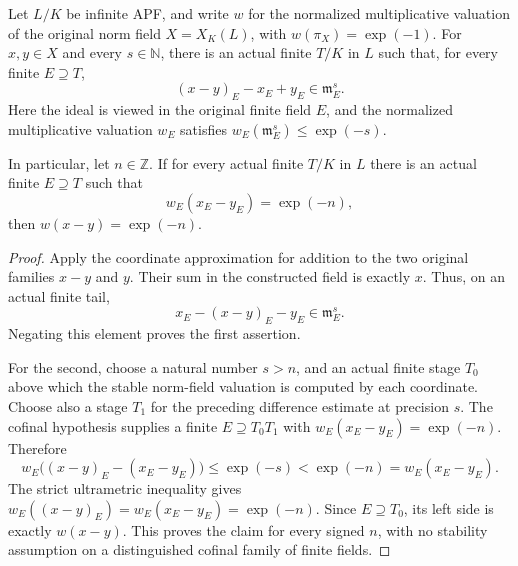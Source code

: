 \begin{lemma}
\label{fw:cofinal-displacement-valuation}
\leanok
Let $L/K$ be infinite APF, and write $w$ for the normalized multiplicative
valuation of the original norm field $X=X_K(L)$, with
$w(\pi_X)=\exp(-1)$. For $x,y\in X$ and every $s\in\mathbb N$, there is
an actual finite $T/K$ in $L$ such that, for every finite $E\supseteq T$,
\[
 (x-y)_E-x_E+y_E\in\mathfrak m_E^s.
\]
Here the ideal is viewed in the original finite field $E$, and the
normalized multiplicative valuation $w_E$ satisfies
$w_E(\mathfrak m_E^s)\leq\exp(-s)$.

In particular, let $n\in\mathbb Z$. If for every actual finite $T/K$ in
$L$ there is an actual finite $E\supseteq T$ such that
\[
 w_E(x_E-y_E)=\exp(-n),
\]
then $w(x-y)=\exp(-n)$.
\end{lemma}
\begin{proof}
Apply the coordinate approximation for addition to the two original
families $x-y$ and $y$. Their sum in the constructed field is exactly
$x$. Thus, on an actual finite tail,
\[
 x_E-(x-y)_E-y_E\in\mathfrak m_E^s.
\]
Negating this element proves the first assertion.

For the second, choose a natural number $s>n$, and an actual finite
stage $T_0$ above which the stable norm-field valuation is computed by
each coordinate. Choose also a stage $T_1$ for the preceding difference
estimate at precision $s$. The cofinal hypothesis supplies a finite
$E\supseteq T_0T_1$ with $w_E(x_E-y_E)=\exp(-n)$. Therefore
\[
 w_E\big((x-y)_E-(x_E-y_E)\big)
 \leq\exp(-s)<\exp(-n)=w_E(x_E-y_E).
\]
The strict ultrametric inequality gives
$w_E((x-y)_E)=w_E(x_E-y_E)=\exp(-n)$.
Since $E\supseteq T_0$, its left side is exactly $w(x-y)$.
This proves the claim for every signed $n$, with no stability assumption
on a distinguished cofinal family of finite fields.
\end{proof}

